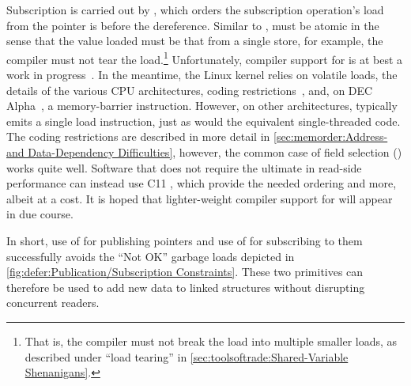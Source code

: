Subscription is carried out by , which orders
the subscription operation's load from the pointer is before the
dereference.
Similar to ,  must be
atomic in the sense that the value loaded must be that from a single
store, for example, the compiler must not tear the load.\footnote{
	That is, the compiler must not break the load into multiple
	smaller loads, as described under ``load tearing'' in
	\cref{sec:toolsoftrade:Shared-Variable Shenanigans}.}
Unfortunately, compiler support for  is at best
a work in progress~\cite{PaulEMcKennneyConsumeP0190R4,PaulEMcKenney2017markconsumeP0462R1,JFBastien2018P0750R1consume}.
In the meantime, the Linux kernel relies on volatile loads, the details of
the various CPU architectures, coding
restrictions~\cite{PaulEMcKenney2014rcu-dereference},
and, on DEC Alpha~\cite{ALPHA2002}, a memory-barrier instruction.
However, on other architectures,  typically
emits a single load instruction, just as would the equivalent single-threaded
code.
The coding restrictions are described in more detail in
\cref{sec:memorder:Address- and Data-Dependency Difficulties},
however, the common case of field selection (\qtco{->}) works quite well.
Software that does not require the ultimate in read-side performance
can instead use C11 , which provide the needed ordering and
more, albeit at a cost.
It is hoped that lighter-weight compiler support for 
will appear in due course.

In short, use of  for publishing pointers and
use of  for subscribing to them successfully avoids the
``Not OK'' garbage loads depicted in
\cref{fig:defer:Publication/Subscription Constraints}.
These two primitives can therefore be used to add new data to linked
structures without disrupting concurrent readers.

